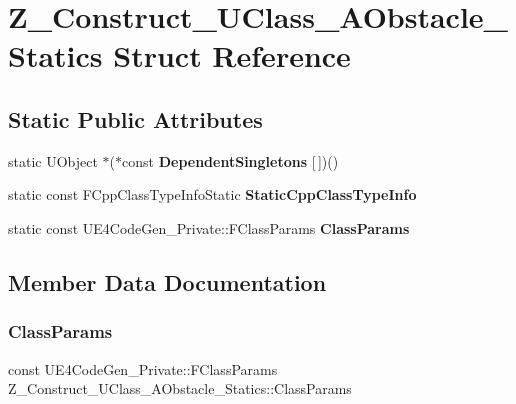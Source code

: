 \hypertarget{struct_z___construct___u_class___a_obstacle___statics}{}\section{Z\+\_\+\+Construct\+\_\+\+U\+Class\+\_\+\+A\+Obstacle\+\_\+\+Statics Struct Reference}
\label{struct_z___construct___u_class___a_obstacle___statics}
\subsection*{Static Public Attributes}
\begin{DoxyCompactItemize}
\item 
\mbox{\label{struct_z___construct___u_class___a_obstacle___statics_a2f1c10bf48967af5c5b8c799694dffe0}} 
static U\+Object $\ast$($\ast$const {\bfseries Dependent\+Singletons} \mbox{[}$\,$\mbox{]})()
\item 
static const F\+Cpp\+Class\+Type\+Info\+Static {\bfseries Static\+Cpp\+Class\+Type\+Info}
\item 
static const U\+E4\+Code\+Gen\+\_\+\+Private\+::\+F\+Class\+Params {\bfseries Class\+Params}
\end{DoxyCompactItemize}


\subsection{Member Data Documentation}
\mbox{\label{struct_z___construct___u_class___a_obstacle___statics_aa7ad8fdf4b291897ed43f013405aac27}} 
\subsubsection{\texorpdfstring{ClassParams}{ClassParams}}
{\footnotesize\ttfamily const U\+E4\+Code\+Gen\+\_\+\+Private\+::\+F\+Class\+Params Z\+\_\+\+Construct\+\_\+\+U\+Class\+\_\+\+A\+Obstacle\+\_\+\+Statics\+::\+Class\+Params\hspace{0.3cm}{\ttfamily [static]}}

